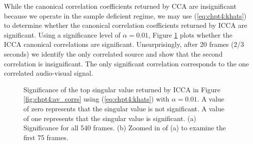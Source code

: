 While the canonical correlation coefficients returned by CCA are insignificant because we
operate in the sample deficient regime, we may use (\ref{eq:chpt4:khats}) to determine whether
the canonical correlation coefficients returned by ICCA are significant. Using a
significance level of $\alpha=0.01$, Figure \ref{fig:chpt4:av_sigs} plots whether the ICCA
canonical correlations are significant. Unsurprisingly, after 20 frames (2/3 seconds) we
identify the only correlated source and show that the second correlation is
insignificant. The only significant correlation corresponds to the one correlated
audio-visual signal.

\begin{figure}
  \begin{center}
    \caption{Significance of the top singular value returned by ICCA in Figure
      \ref{fig:chpt4:av_corrs} using (\ref{eq:chpt4:khats}) with $\alpha=0.01$. A
      value of zero represents that the singular value is not significant. A value of one
      represents that the singular value is significant. (a) Significance for all 540
      frames. (b) Zoomed in of (a) to examine the first 75 frames.}
    \label{fig:chpt4:av_sigs}
  \end{center}
\end{figure}

